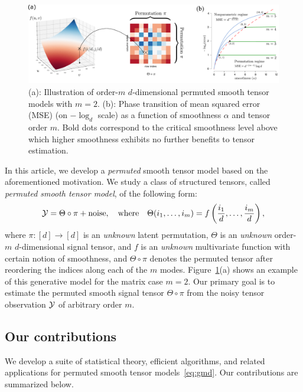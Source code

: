 \documentclass[11pt]{article}
\theoremstyle{definition}
\begin{document}
\begin{figure}[t]
    \centering
    \includegraphics[width = .95\textwidth]{figure/semantic_new.pdf}
    \caption{(a): Illustration of order-$m$ $d$-dimensional permuted smooth tensor models with $m=2$. (b): Phase transition of mean squared error (MSE) (on $-\log_d$ scale) as a function of smoothness $\alpha$ and tensor order $m$. Bold dots correspond to the critical smoothness level above which higher smoothness exhibits no further benefits to tensor estimation. }
    \label{fig:rate}
\end{figure}


In this article, we develop a \emph{permuted} smooth tensor model based on the aforementioned  motivation. We study a class of structured tensors, called \emph{permuted smooth tensor model}, of the following form:
\begin{align}\label{eq:gmd}
    \mathcal{Y} = \Theta\circ \pi + \text{noise}, \quad \text{where}\quad \Theta(i_1,\ldots,i_m)=f\left({i_1\over d},\ldots,{i_m\over d}\right),
\end{align}
where $\pi\colon[d]\rightarrow[d]$ is an \emph{unknown} latent permutation, $\Theta$ is an \emph{unknown} order-$m$ $d$-dimensional signal tensor, and $f$ is an \emph{unknown} multivariate function with certain notion of smoothness, and $\Theta \circ \pi $ denotes the permuted tensor after reordering the indices along each of the $m$ modes. Figure~\ref{fig:rate}(a) shows an example of this generative model for the matrix case $m=2$. Our primary goal is to estimate the permuted smooth signal tensor $\Theta \circ \pi$ from the noisy tensor observation $\mathcal{Y}$ of arbitrary order $m$. 


\subsection{Our contributions}
We develop a suite of statistical theory, efficient algorithms, and related applications for permuted smooth tensor models~\eqref{eq:gmd}.  
Our contributions are summarized below. 
\end{document}
